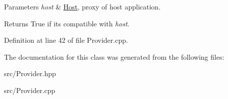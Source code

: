 \begin{DoxyParams}{Parameters}
{\em host} & \hyperlink{classpluma_1_1_host}{Host}, proxy of host application.\\
\hline
\end{DoxyParams}
\begin{DoxyReturn}{Returns}
True if it\textquotesingle{}s compatible with {\itshape host}. 
\end{DoxyReturn}


Definition at line 42 of file Provider.\+cpp.



The documentation for this class was generated from the following files\+:\begin{DoxyCompactItemize}
\item 
src/Provider.\+hpp\item 
src/Provider.\+cpp\end{DoxyCompactItemize}
